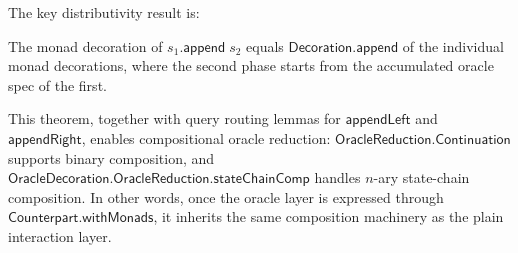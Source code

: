 The key distributivity result is:

\begin{theorem}
  \label{thm:to-monad-decoration-append}
  The monad decoration of $s_1.\mathsf{append}\;s_2$ equals
  $\mathsf{Decoration.append}$ of the individual monad decorations, where the
  second phase starts from the accumulated oracle spec of the first.
\end{theorem}

This theorem, together with query routing lemmas for $\mathsf{appendLeft}$ and
$\mathsf{appendRight}$, enables compositional oracle reduction:
$\mathsf{OracleReduction.Continuation}$ supports binary composition, and
$\mathsf{OracleDecoration.OracleReduction.stateChainComp}$ handles $n$-ary
state-chain composition.  In other words, once the oracle layer is expressed
through $\mathsf{Counterpart.withMonads}$, it inherits the same composition
machinery as the plain interaction layer.
